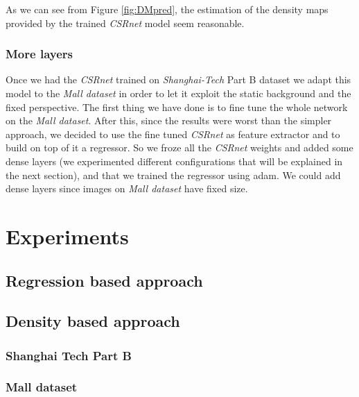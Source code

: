 \documentclass[10pt,twocolumn,letterpaper]{article}
\begin{document}
As we can see from Figure \ref{fig:DMpred}, the estimation of the density maps provided by the trained \textit{CSRnet} model seem reasonable.
\subsubsection{More layers}
Once we had the \textit{CSRnet} trained on \textit{Shanghai-Tech} Part B dataset we adapt this model to the \textit{Mall dataset} in order to let it exploit the static background and the fixed perspective. The first thing we have done is to fine tune the whole network on the \textit{Mall dataset}. After this, since the results were worst than the simpler approach, we decided to use the fine tuned \textit{CSRnet} as feature extractor and to build on top of it a regressor. So we froze all the \textit{CSRnet} weights and added some dense layers (we experimented different configurations that will be explained in the next section), and that we trained the regressor using adam. We could add dense layers since images on \textit{Mall dataset} have fixed size. 
\section{Experiments}
\subsection{Regression based approach}
\subsection{Density based approach}
\subsubsection{Shanghai Tech Part B}
\subsubsection{Mall dataset}







\printbibliography

%
%
\end{document}
